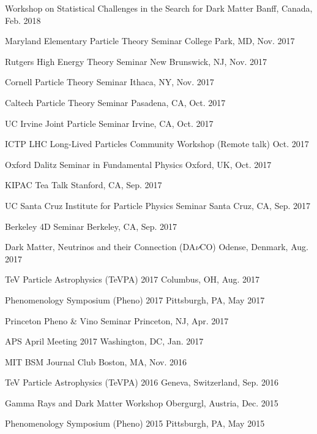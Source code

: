 \documentclass[11pt]{article}
\newenvironment{packed_itemize}{
\begin{itemize}
  \setlength{\itemsep}{3pt}
  \setlength{\parskip}{0pt}
  \setlength{\parsep}{0pt}}{\end{itemize}
}
\begin{document}
\begin{packed_itemize}
\item Workshop on Statistical Challenges in the Search for Dark Matter \hfill Banff, Canada, Feb. 2018
\item Maryland Elementary Particle Theory Seminar \hfill College Park, MD, Nov. 2017
\item Rutgers High Energy Theory Seminar \hfill New Brunswick, NJ, Nov. 2017
\item Cornell Particle Theory Seminar \hfill Ithaca, NY, Nov. 2017
\item Caltech Particle Theory Seminar \hfill Pasadena, CA, Oct. 2017
\item UC Irvine Joint Particle Seminar \hfill Irvine, CA, Oct. 2017
\item ICTP LHC Long-Lived Particles Community Workshop (Remote talk) \hfill Oct. 2017
\item Oxford Dalitz Seminar in Fundamental Physics  \hfill Oxford, UK, Oct. 2017
\item KIPAC Tea Talk  \hfill Stanford, CA, Sep. 2017
\item UC Santa Cruz Institute for Particle Physics Seminar  \hfill Santa Cruz, CA, Sep. 2017
\item Berkeley 4D Seminar  \hfill Berkeley, CA, Sep. 2017
\item Dark Matter, Neutrinos and their Connection (DA$\nu$CO) \hfill Odense, Denmark, Aug. 2017
\item TeV Particle Astrophysics (TeVPA) 2017 \hfill Columbus, OH, Aug. 2017 
\item Phenomenology Symposium (Pheno) 2017 \hfill Pittsburgh, PA, May 2017 
\item Princeton Pheno \& Vino Seminar \hfill Princeton, NJ, Apr. 2017
\item APS April Meeting 2017 \hfill Washington, DC, Jan. 2017 
\item MIT BSM Journal Club \hfill Boston, MA, Nov. 2016
\item TeV Particle Astrophysics (TeVPA) 2016 \hfill Geneva, Switzerland, Sep. 2016 
\item Gamma Rays and Dark Matter Workshop \hfill Obergurgl, Austria, Dec. 2015
\item Phenomenology Symposium (Pheno) 2015 \hfill Pittsburgh, PA, May 2015
\end{packed_itemize}


\vspace{2.0mm}
\end{document}
